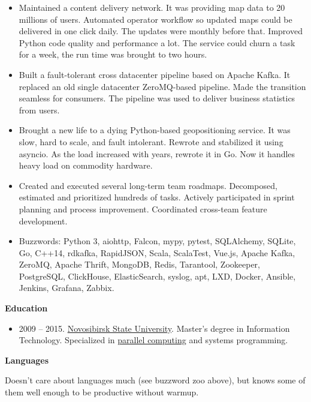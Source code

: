 \documentclass[final]{letter}
\begin{document}
\begin{itemize}
  \begin{itemize}
    \item Maintained a content delivery network. It was providing map data to 20 millions of users.
      Automated operator workflow so updated maps could be delivered in one click daily.
      The updates were monthly before that.
      Improved Python code quality and performance a lot.
       The service could churn a task for a week, the run time was brought to two hours.
    \item Built a fault-tolerant cross datacenter pipeline based on Apache Kafka.
      It replaced an old single datacenter ZeroMQ-based pipeline.
      Made the transition seamless for consumers. The pipeline was used to deliver business statistics from users.
    \item Brought a new life to a dying Python-based geopositioning service.
    It was slow, hard to scale, and fault intolerant.
      Rewrote and stabilized it using asyncio.
      As the load increased with years, rewrote it in Go.
      Now it handles heavy load on commodity hardware.
    \item Created and executed several long-term team roadmaps.
     Decomposed, estimated and prioritized hundreds of tasks.
    Actively participated in sprint planning and process improvement.
    Coordinated cross-team feature development.
    \item Buzzwords: Python 3, aiohttp, Falcon, mypy, pytest, SQLAlchemy, SQLite, Go, C++14, rdkafka, RapidJSON,
     Scala, ScalaTest, Vue.js, Apache Kafka, ZeroMQ, Apache Thrift,
     MongoDB, Redis, Tarantool, Zookeeper, PostgreSQL, ClickHouse, ElasticSearch, syslog, apt, LXD, Docker, Ansible, Jenkins, Grafana, Zabbix.
  \end{itemize}

  \end{itemize}

{\bf Education}
\begin{itemize}
  \item 2009 -- 2015. \href{https://www.nsu.ru/n/}{Novosibirsk State University}.
  Master's degree in Information Technology.
  Specialized in \href{http://ssd.sscc.ru/en/info}{parallel computing} and systems programming.
\end{itemize}

\newpage

{\bf Languages}

Doesn't care about languages much (see buzzword zoo above), but knows some of them well enough to be productive without warmup.
\end{document}
